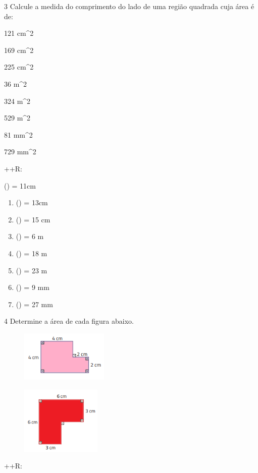 \num{3} Calcule a medida do comprimento do lado de uma região quadrada cuja
área é de:
\item 121 cm^2
\item 169 cm^2
\item 225 cm^2
\item 36 m^2
\item 324 m^2
\item 529 m^2
\item 81 mm^2
\item 729 mm^2

++R:
\item () = 11cm

\begin{enumerate}
\def\labelenumi{\alph{enumi})}
\setcounter{enumi}{1}
\item
  () = 13cm
\item
  () = 15 cm
\item
  () = 6 m
\item
  () = 18 m
\item
  () = 23 m
\item
  () = 9 mm
\item
  () = 27 mm
\end{enumerate}

\num{4} Determine a área de cada figura abaixo.
\item
\begin{figure}[H]
\centering\includegraphics[width=1.65in,height=0.96458in]{./imgSAEB_8_MAT/media/image43.png}
\end{figure}
\item
\begin{figure}[H]
\centering\includegraphics[width=1.50833in,height=1.28681in]{./imgSAEB_8_MAT/media/image44.png}
\end{figure}

++R:
\item

